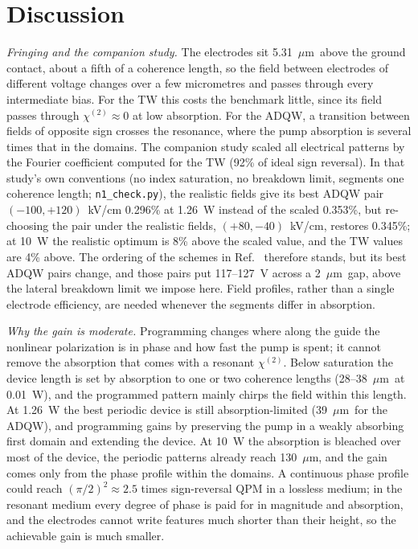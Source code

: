 \documentclass[11pt]{article}
\newcommand{\chitwo}{\chi^{(2)}}
\newcommand{\um}{~$\mu$m}
\begin{document}
\section{Discussion}\label{sec:disc}
\emph{Fringing and the companion study.} The electrodes sit 5.31\um\ above the ground contact, about a fifth of a coherence length, so the field between electrodes of different voltage changes over a few micrometres and passes through every intermediate bias. For the TW this costs the benchmark little, since its field passes through $\chitwo\approx0$ at low absorption. For the ADQW, a transition between fields of opposite sign crosses the resonance, where the pump absorption is several times that in the domains. The companion study \cite{OwnbyN1} scaled all electrical patterns by the Fourier coefficient computed for the TW (92\% of ideal sign reversal). In that study's own conventions (no index saturation, no breakdown limit, segments one coherence length; \texttt{n1\_check.py}), the realistic fields give its best ADQW pair $(-100,+120)$~kV/cm 0.296\% at 1.26~W instead of the scaled 0.353\%, but re-choosing the pair under the realistic fields, $(+80,-40)$~kV/cm, restores 0.345\%; at 10~W the realistic optimum is 8\% above the scaled value, and the TW values are 4\% above. The ordering of the schemes in Ref.~\cite{OwnbyN1} therefore stands, but its best ADQW pairs change, and those pairs put 117--127~V across a 2\um\ gap, above the lateral breakdown limit we impose here. Field profiles, rather than a single electrode efficiency, are needed whenever the segments differ in absorption.

\emph{Why the gain is moderate.} Programming changes where along the guide the nonlinear polarization is in phase and how fast the pump is spent; it cannot remove the absorption that comes with a resonant $\chitwo$. Below saturation the device length is set by absorption to one or two coherence lengths (28--38\um\ at 0.01~W), and the programmed pattern mainly chirps the field within this length. At 1.26~W the best periodic device is still absorption-limited (39\um\ for the ADQW), and programming gains by preserving the pump in a weakly absorbing first domain and extending the device. At 10~W the absorption is bleached over most of the device, the periodic patterns already reach 130\um, and the gain comes only from the phase profile within the domains. A continuous phase profile could reach $(\pi/2)^2\approx2.5$ times sign-reversal QPM in a lossless medium; in the resonant medium every degree of phase is paid for in magnitude and absorption, and the electrodes cannot write features much shorter than their height, so the achievable gain is much smaller.
\end{document}
